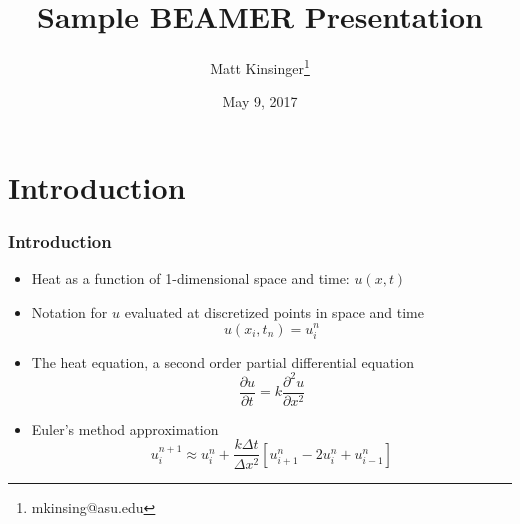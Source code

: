 \documentclass[compress]{beamer}
\title{Sample BEAMER Presentation}
\author{ Matt Kinsinger\thanks{mkinsing@asu.edu} }
\date{May 9, 2017}
\institute[Mathematics and Statistics]{
\texttt{[image: ASUlogo.pdf]} \\
{\color{ASUred} SCHOOL OF \textbf{MATHEMATICAL AND STATISTICAL SCIENCES}}}
\begin{document}
%
%
\begin{frame}[plain]
	\titlepage
	\transboxout
\end{frame}

%
%
\section{Introduction}\label{Introduction}

\begin{frame}\frametitle{Introduction} %
\begin{itemize}
\item Heat as a function of 1-dimensional space and time: $u(x,t)$
\item Notation for $u$ evaluated at discretized points in space and time $$u(x_i,t_n)=u_i^n$$
\item The heat equation, a second order partial differential equation
$$\frac{\partial u}{\partial t}=k\frac{\partial ^2u}{\partial x^2 }$$
\item Euler's method approximation
$$u_i^{n+1}\approx u_i^n+\frac{k\Delta t}{\Delta x^2}\left[u_{i+1}^n-2u_i^n+u_{i-1}^n\right]$$
\end{itemize}
\end{frame}
\end{document}
